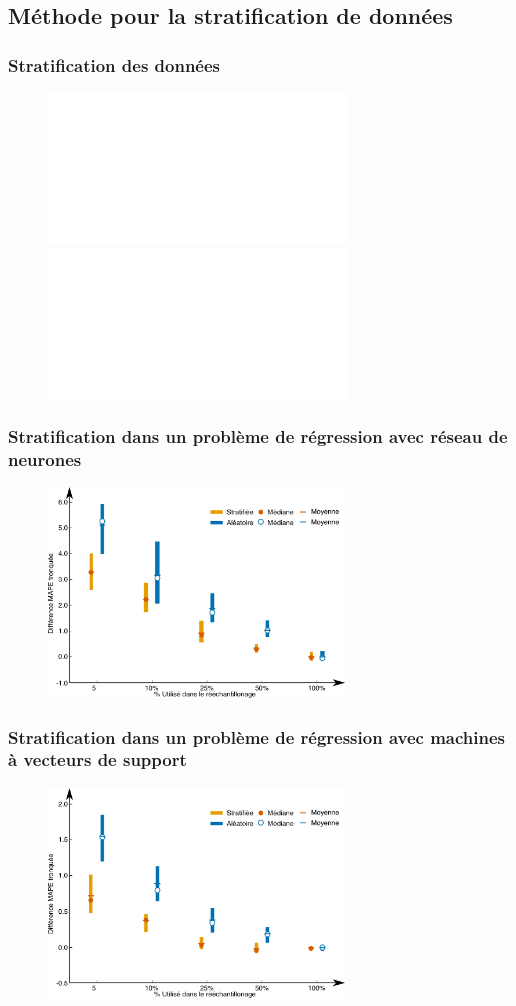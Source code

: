 \documentclass[french]{beamer}
\begin{document}
{\subsection{Méthode pour la stratification de données}
\begin{frame}
\frametitle{Stratification des données} 
\begin{figure}
\begin{center}
\includegraphics<1>[width=0.9\linewidth]{figClusteringTrainingFr_222_summer1.pdf}
\includegraphics<2>[width=0.9\linewidth]{figStratEstimFr_222_summer1.pdf}
\end{center}
\end{figure}
\end{frame}
% 
\begin{frame}
\frametitle{Stratification dans un problème de régression avec réseau de neurones} 
\begin{figure}
\begin{center}
\includegraphics[width=0.7\textwidth]{figDiff_ANN_Inp_state_year_2003.pdf}
\end{center}
\end{figure}
\end{frame}

\begin{frame}
\frametitle{Stratification dans un problème de régression avec machines à vecteurs de support} 
\begin{figure}
\begin{center}
\includegraphics[width=0.7\textwidth]{figDiff_SVR_Inp_state_year_2003.pdf}
\end{center}
\end{figure}
\end{frame}




}
\end{document}
